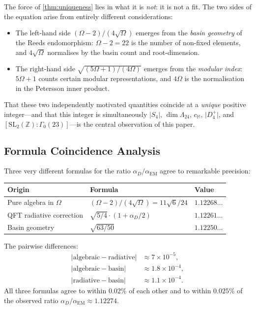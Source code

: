 \documentclass[11pt,a4paper]{article}
\theoremstyle{plain}
\theoremstyle{remark}
\renewcommand{\Omega}{\varOmega}
\newcommand{\Z}{\mathbb{Z}}
\newcommand{\abs}[1]{\lvert #1 \rvert}
\newcommand{\SL}{\mathrm{SL}}
\newcommand{\aD}{\alpha_D}
\newcommand{\aEM}{\alpha_{\mathrm{EM}}}
\begin{document}
The force of \cref{thm:uniqueness} lies in what it is \emph{not}: it is not
a fit.  The two sides of the equation arise from entirely different
considerations:

\begin{itemize}[itemsep=4pt]
\item The left-hand side $(\Omega-2)/(4\sqrt{\Omega})$ emerges from
  the \emph{basin geometry} of the Reeds endomorphism: $\Omega-2 = 22$
  is the number of non-fixed elements, and $4\sqrt{\Omega}$ normalises
  by the basin count and root-dimension.

\item The right-hand side $\sqrt{(5\Omega+1)/(4\Omega)}$ emerges from
  the \emph{modular index}: $5\Omega+1$ counts certain modular
  representations, and $4\Omega$ is the normalisation in the Petersson
  inner product.
\end{itemize}

That these two independently motivated quantities coincide at a
\emph{unique} positive integer---and that this integer is simultaneously
$\abs{S_4}$, $\dim\Lambda_{24}$, $c_{\mathbb{M}}$, $\abs{D_4^+}$, and
$[\SL_2(\Z):\Gamma_0(23)]$---is the central observation of this paper.

\subsection{Formula Coincidence Analysis}
\label{sec:uniq-coincidence}

Three very different formulas for the ratio $\aD/\aEM$ agree to remarkable
precision:

\begin{center}
\begin{tabular}{lll}
\toprule
\textbf{Origin} & \textbf{Formula} & \textbf{Value} \\
\midrule
Pure algebra in $\Omega$ &
  $(\Omega-2)/(4\sqrt{\Omega}) = 11\sqrt{6}/24$ & $1.12268\ldots$ \\
QFT radiative correction &
  $\sqrt{5/4}\cdot(1+\aD/2)$ & $1.12261\ldots$ \\
Basin geometry &
  $\sqrt{63/50}$ & $1.12250\ldots$ \\
\bottomrule
\end{tabular}
\end{center}

\smallskip\noindent
The pairwise differences:
\begin{align*}
  \abs{\text{algebraic} - \text{radiative}} &\approx 7\times 10^{-5},\\
  \abs{\text{algebraic} - \text{basin}} &\approx 1.8\times 10^{-4},\\
  \abs{\text{radiative} - \text{basin}} &\approx 1.1\times 10^{-4}.
\end{align*}
All three formulas agree to within $0.02\%$ of each other and to within
$0.025\%$ of the observed ratio $\aD/\aEM \approx 1.12274$.
\end{document}
